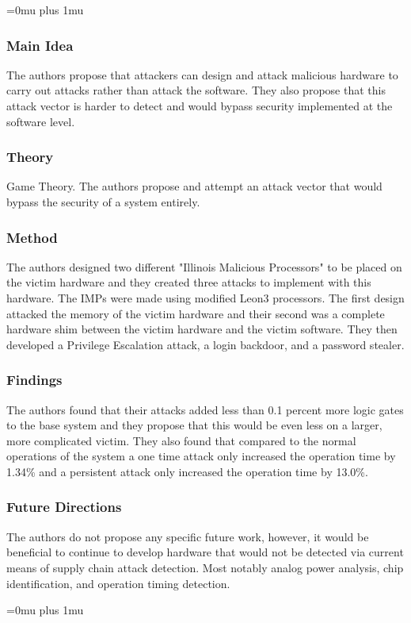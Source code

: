 \Urlmuskip=0mu plus 1mu\relax

\subsubsection{Main Idea}

\noindent
The authors propose that attackers can design and attack malicious hardware to carry out attacks rather than attack the software.  They also propose that this attack vector is harder to detect and would bypass security implemented at the software level.

\subsubsection{Theory}

\noindent
Game Theory.  The authors propose and attempt an attack vector that would bypass the security of a system entirely.

\subsubsection{Method}

\noindent
The authors designed two different "Illinois Malicious Processors" to be placed on the victim hardware and they created three attacks to implement with this hardware.  The IMPs were made using modified Leon3 processors.  The first design attacked the memory of the victim hardware and their second was a complete hardware shim between the victim hardware and the victim software. They then developed a Privilege Escalation attack, a login backdoor, and a password stealer.

\subsubsection{Findings}

\noindent
The authors found that their attacks added less than 0.1 percent more logic gates to the base system and they propose that this would be even less on a larger, more complicated victim.  They also found that compared to the normal operations of the system a one time attack only increased the operation time by 1.34\% and a persistent attack only increased the operation time by 13.0\%.  

\subsubsection{Future Directions}

\noindent
The authors do not propose any specific future work, however, it would be beneficial to continue to develop hardware that would not be detected via current means of supply chain attack detection.  Most notably analog power analysis, chip identification, and operation timing detection.

\Urlmuskip=0mu plus 1mu\relax
\pagebreak
